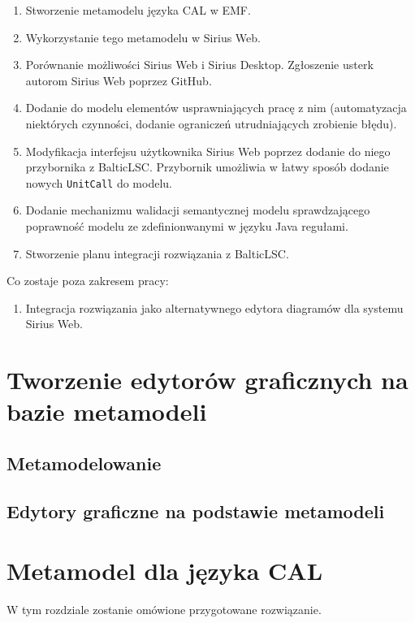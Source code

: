 \begin{enumerate}
	\item Stworzenie metamodelu języka CAL w EMF\@.
	\item Wykorzystanie tego metamodelu w Sirius Web.
	\item Porównanie możliwości Sirius Web i Sirius Desktop. Zgłoszenie usterk autorom Sirius Web poprzez GitHub.
	\item Dodanie do modelu elementów usprawniających pracę z nim (automatyzacja niektórych czynności, dodanie ograniczeń utrudniających zrobienie błędu).
	\item Modyfikacja interfejsu użytkownika Sirius Web poprzez dodanie do niego przybornika z BalticLSC\@. Przybornik umożliwia w łatwy sposób dodanie nowych \texttt{UnitCall} do modelu.
	\item Dodanie mechanizmu walidacji semantycznej modelu sprawdzającego poprawność modelu ze zdefinionwanymi w języku Java regułami.
	\item Stworzenie planu integracji rozwiązania z BalticLSC\@.
\end{enumerate}

\noindent Co zostaje poza zakresem pracy:

\begin{enumerate}
	\item Integracja rozwiązania jako alternatywnego edytora diagramów dla systemu Sirius Web.
\end{enumerate}

\chapter{Tworzenie edytorów graficznych na bazie metamodeli}

\section{Metamodelowanie}

\section{Edytory graficzne na podstawie metamodeli}

\chapter{Metamodel dla języka CAL}

W tym rozdziale zostanie omówione przygotowane rozwiązanie.

